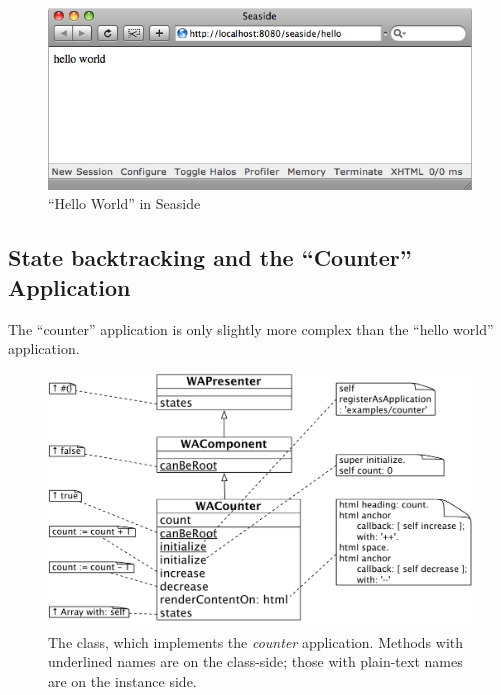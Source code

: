 \documentclass[a4paper,10pt,twoside]{book}
\begin{document}
\begin{figure}[htb]
\begin{center}
\includegraphics[width=\textwidth]{WAHelloWorld}
\caption{``Hello World'' in Seaside}
\end{center}
\end{figure}

\subsection{State backtracking and the ``Counter'' Application}

The ``counter'' application is only slightly more complex than the ``hello world'' application.

\begin{figure}[ht]
\begin{center}
\includegraphics[width=\textwidth]{WACounter}
\caption{The  class, which implements the \emph{counter} application.  Methods with underlined names are on the class-side; those with plain-text names are on the instance side.}
\end{center}
\end{figure}
\end{document}
